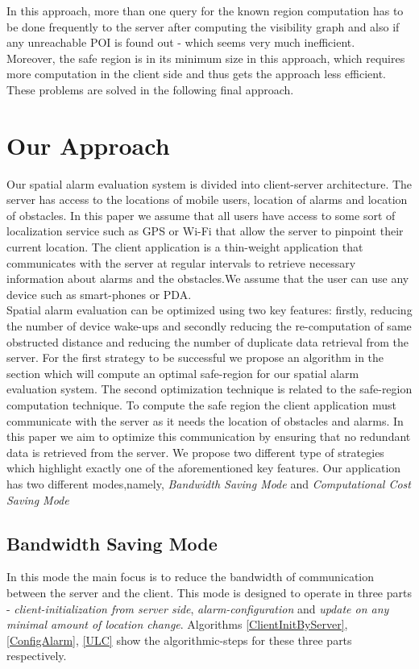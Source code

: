 \documentclass{sig-alternate}
\begin{document}
In this approach, more than one query for the known region computation has to be done frequently to the server after computing the visibility graph and also if any unreachable POI is found out - which seems very much inefficient.
\\ Moreover, the safe region is in its minimum size in this approach, which requires more computation in the client side and thus gets the approach less efficient.
\\ These problems are solved in the following final approach.

\section{Our Approach}
Our spatial alarm evaluation system is divided into client-server architecture. The server has access to the locations of mobile users, location of alarms and location of obstacles. In this paper we assume that all users have access to some sort of localization service such as GPS or Wi-Fi that allow the server to pinpoint their current location. The client application is a thin-weight application that communicates with the server at regular intervals to retrieve necessary information about alarms and the obstacles.We assume that the user can use any device such as smart-phones or PDA.\\
Spatial alarm evaluation can be optimized using two key features: firstly, reducing the number of device wake-ups and secondly reducing the re-computation of same obstructed distance and reducing the number of duplicate data retrieval from the server. For the first strategy to be successful we propose an algorithm in the section which will compute an optimal safe-region for our spatial alarm evaluation system. The second optimization technique is related to the safe-region computation technique. To compute the safe region the client application must communicate with the server as it needs the location of obstacles and alarms. In this paper we aim to optimize this communication by ensuring that no redundant data is retrieved from the server. We propose two different type of strategies which highlight exactly one of the aforementioned key features. Our application has two different modes,namely, \textit{Bandwidth Saving Mode} and \textit{Computational Cost Saving Mode}

\subsection{Bandwidth Saving Mode}
In this mode the main focus is to reduce the bandwidth of communication between the server and the client. This mode is designed to operate in three parts - \textit{client-initialization from server side}, \textit{alarm-configuration} and \textit{update on any minimal amount of location change}. Algorithms \ref{ClientInitByServer}, \ref{ConfigAlarm}, \ref{ULC} show the algorithmic-steps for these three parts respectively.
\end{document}
